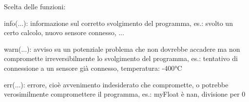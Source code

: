 Scelta delle funzioni\+:
\begin{DoxyItemize}
\item {\ttfamily info(...)}\+: informazione sul corretto svolgimento del programma, es.\+: svolto un certo calcolo, nuovo sensore connesso, ...
\item {\ttfamily warn(...)}\+: avviso su un potenziale problema che non dovrebbe accadere ma non compromette irreversibilmente lo svolgimento del programma, es.\+: tentativo di connessione a un sensore già connesso, temperatura\+: -\/400°C
\item {\ttfamily err(...)}\+: errore, cioè avvenimento indesiderato che compromette, o potrebbe verosimilmente compromettere il programma, es.\+: my\+Float è nan, divisione per 0 
\end{DoxyItemize}